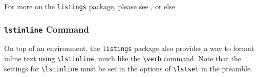 For more on the \lstinline{listings} package, please see , or else 

\subsubsection{\texttt{lstinline} Command}

On top of an environment, the \lstinline{listings} package also provides a way to format inline text using \lstinline|\lstinline|, much like the \lstinline{\verb} command. Note that the settings for \lstinline|\lstinline| must be set in the options of \lstinline|\lstset| in the preamble.
